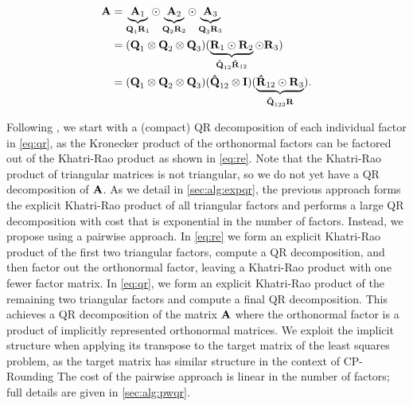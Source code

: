 \documentclass{article}
\newcommand{\M}[2][]{\bm{#1{\mathbf{\MakeUppercase{#2}}}}} 		%
\newcommand{\kr}{\odot}
\newcommand{\kron}{\otimes}
\begin{document}
\begin{align}
\M{A} &= \underbrace{\M{A}_1}_{{\M{Q}_1\M{R}_1}} \kr \underbrace{\M{A}_2}_{{\M{Q}_2\M{R}_2}} \kr \underbrace{\M{A}_3}_{{\M{Q}_3\M{R}_3}}   \label{eq:qr} \\ 
&= (\M{Q}_1 \kron \M{Q}_2 \kron \M{Q}_3) (\underbrace{\M{R}_1 \kr \M{R}_2}_{\M[\hat]{Q}_{12} \M[\hat]{R}_{12}} \kr \M{R}_3)  \label{eq:re} \\
&= (\M{Q}_1 \kron \M{Q}_2 \kron \M{Q}_3) (\M[\hat]{Q}_{12} \kron \M{I}) (\underbrace{\M[\hat]{R}_{12} \kr \M{R}_3}_{\M[\hat]{Q}_{123} \M{R}}).  \label{eq:pw} 
\end{align}

Following \cite{MVLB23}, we start with a (compact) QR decomposition of each individual factor in \cref{eq:qr}, as the Kronecker product of the orthonormal factors can be factored out of the Khatri-Rao product as shown in \cref{eq:re}.
Note that the Khatri-Rao product of triangular matrices is not triangular, so we do not yet have a QR decomposition of $\M{A}$.
As we detail in \cref{sec:alg:expqr}, the previous approach forms the explicit Khatri-Rao product of all triangular factors and performs a large QR decomposition with cost that is exponential in the number of factors.
Instead, we propose using a pairwise approach.
In \cref{eq:re} we form an explicit Khatri-Rao product of the first two triangular factors, compute a QR decomposition, and then factor out the orthonormal factor, leaving a Khatri-Rao product with one fewer factor matrix.
In \cref{eq:qr}, we form an explicit Khatri-Rao product of the remaining two triangular factors and compute a final QR decomposition.
This achieves a QR decomposition of the matrix $\M{A}$ where the orthonormal factor is a product of implicitly represented orthonormal matrices.
We exploit the implicit structure when applying its transpose to the target matrix of the least squares problem, as the target matrix has similar structure in the context of CP-Rounding 
The cost of the pairwise approach is linear in the number of factors; full details are given in \cref{sec:alg:pwqr}.
 
\end{document}
